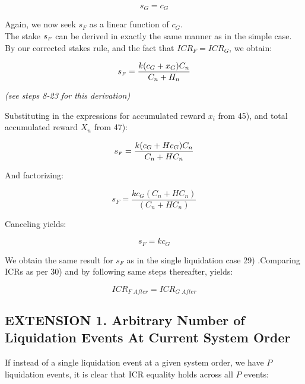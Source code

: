 \documentclass[reqno]{article}
\begin{document}
\begin{equation} 
    s_G=c_G
\end{equation}

\bigskip
Again, we now seek $s_F$ as a linear function of $c_G$.\\

The stake $s_\mathsmaller{F}$ can be derived in exactly the same manner as in the simple case. By our corrected stakes rule, and the fact that $ICR_F = ICR_G$, we obtain:

\begin{equation} 
    s_\mathsmaller{F}=\frac{k(c_G+x_G)C_n}{C_n+H_n}
\end{equation}

\begin{center}
   \textit{(see steps 8-23 for this derivation)} 
\end{center} 

\bigskip
Substituting in the expressions for accumulated reward $x_i$ from 45), and total accumulated reward $X_n$ from 47):

\begin{equation} 
    s_\mathsmaller{F}=\frac{k(c_G+Hc_G)C_n}{C_n+HC_n}
\end{equation}

\bigskip
And factorizing:

\begin{equation} 
    s_F=\frac{kc_G(C_n+HC_n)}{(C_n+HC_n)}
\end{equation}

\bigskip
Canceling yields:

\begin{equation} 
    s_F=kc_G
\end{equation}

\bigskip
We obtain the same result for $s_F$ as in the single liquidation case 29) .Comparing ICRs as per 30) and by following same steps thereafter, yields:

\begin{equation} 
    ICR_{F \; After}=ICR_{G \; After}
\end{equation}

\bigskip
\subsection*{EXTENSION 1. Arbitrary Number of Liquidation Events At Current System Order}

If instead of a single liquidation event at a given system order, we have $P$ liquidation events, it is clear that ICR equality holds across all $P$ events:\\
\end{document}
